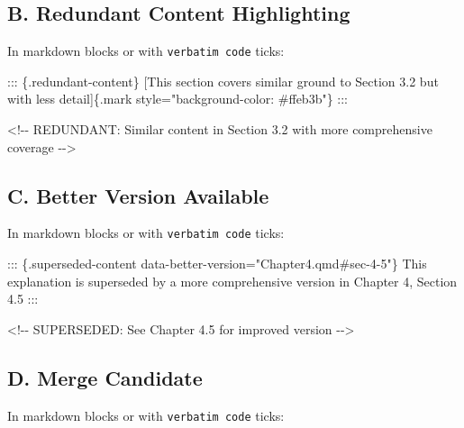 \documentclass[
  11pt,
  letterpaper,
]{book}
\newenvironment{Shaded}{\begin{snugshade}}{\end{snugshade}}
\newcommand{\CommentTok}[1]{\textcolor[rgb]{0.37,0.37,0.37}{#1}}
\newcommand{\NormalTok}[1]{\textcolor[rgb]{0.00,0.23,0.31}{#1}}
\newcommand{\OtherTok}[1]{\textcolor[rgb]{0.00,0.23,0.31}{#1}}
\begin{document}
\subsection*{B. Redundant Content
Highlighting}\label{b.-redundant-content-highlighting}

In markdown blocks or with \texttt{verbatim\ code} ticks:

\begin{Shaded}
\begin{Highlighting}[]
\NormalTok{::: \{.redundant{-}content\}}
\CommentTok{[}\OtherTok{This section covers similar ground to Section 3.2 but with less detail}\CommentTok{]}\NormalTok{\{.mark style="background{-}color: \#ffeb3b"\}}
\NormalTok{:::}

\CommentTok{\textless{}!{-}{-} REDUNDANT: Similar content in Section 3.2 with more comprehensive coverage {-}{-}\textgreater{}}
\end{Highlighting}
\end{Shaded}

\subsection*{C. Better Version
Available}\label{c.-better-version-available}

In markdown blocks or with \texttt{verbatim\ code} ticks:

\begin{Shaded}
\begin{Highlighting}[]
\NormalTok{::: \{.superseded{-}content data{-}better{-}version="Chapter4.qmd\#sec{-}4{-}5"\}}
\NormalTok{This explanation is superseded by a more comprehensive version in Chapter 4, Section 4.5}
\NormalTok{:::}

\CommentTok{\textless{}!{-}{-} SUPERSEDED: See Chapter 4.5 for improved version {-}{-}\textgreater{}}
\end{Highlighting}
\end{Shaded}

\subsection*{D. Merge Candidate}\label{d.-merge-candidate}

In markdown blocks or with \texttt{verbatim\ code} ticks:
\end{document}
